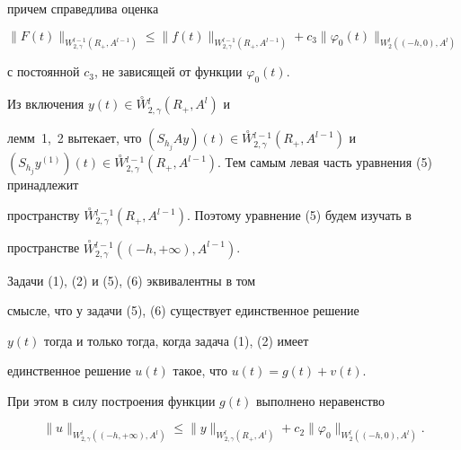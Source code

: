 причем справедлива оценка


\begin{equation}


\| F(t)\|_{W^{l-1}_{2,\gamma }(R_+,A^{l-1})} \leq \| f(t)\|


_{W^{l-1}_{2,\gamma }(R_+,A^{l-1})}+ c_3\| \varphi_0(t)\|


_{W^l_{2}((-h,0),A^l)} 


\end{equation}


с постоянной $c_3$, не зависящей от функции $\varphi_0(t)$.


Из включения $y(t)\in


\overset{\circ}{W}{}^l_{2,\gamma }(R_+,A^l)$ и


лемм~1,~2 вытекает, что $(S_{h_j}Ay)(t)\in


\overset{\circ}{W}{}^{l-1}_{2,\gamma


}(R_+,A^{l-1})$ и $(S_{h_j}y^{(1)})(t)\in


\overset{\circ}{W}{}^{l-1}_{2,\gamma


}(R_+,A^{l-1})$. Тем самым левая часть уравнения (5) принадлежит


пространству $\overset{\circ}{W}{}^{l-1}_{2,\gamma


}(R_+,A^{l-1})$. Поэтому уравнение (5) будем изучать в


пространстве $\overset{\circ}{W}{}^{l-1}_{2,\gamma


}((-h,+\infty ),A^{l-1})$.





\begin{note}


Задачи (1), (2) и (5), (6) эквивалентны в том


смысле, что у задачи (5), (6) существует единственное решение


$y(t)$ тогда и только тогда, когда задача (1), (2) имеет


единственное решение $u(t)$ такое, что $u(t)=g(t)+v(t)$.


При этом в силу построения функции $g(t)$ выполнено неравенство


$$


\| u\|_{W^l_{2,\gamma }((-h,+\infty ),A^l)}\leq \| y\|


_{W^l_{2,\gamma }(R_+,A^l)}+ c_2\| \varphi_0\|_{W^l_2((-h,0),


A^l)}.


$$


\end{note}





